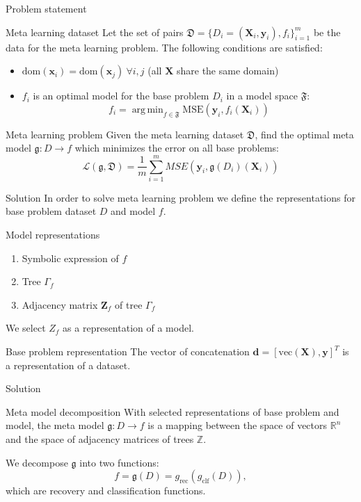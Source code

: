 \documentclass{beamer}
\DeclareMathOperator*{\argmin}{arg\,min}
\begin{document}
\begin{frame}{Problem statement}
	\begin{block}{Meta learning dataset}
		Let the set of pairs $\mathfrak{D} = \{D_i = (\mathbf{X}_i, \mathbf{y}_i), f_i\}_{i=1}^m$ be the data for the meta learning problem. The following conditions are satisfied:
		\begin{itemize}
			\item $\text{dom}(\mathbf{x}_i) = \text{dom}(\mathbf{x}_j)\ \forall i, j$ (all $\mathbf{X}$ share the same domain)
			\item $f_i$ is an optimal model for the base problem $D_i$ in a model space $\mathfrak{F}$:
			\[f_i = \argmin_{f \in \mathfrak{F}} \text{MSE}(\mathbf{y}_i, f_i(\mathbf{X}_i))\]
		\end{itemize}
	\end{block}
	\begin{block}{Meta learning problem}
		Given the meta learning dataset $\mathfrak{D}$, find the optimal meta model $\mathfrak{g}: D \rightarrow f$ which minimizes the error on all base problems:
		\[\mathcal{L}(\mathfrak{g}, \mathfrak{D}) = \frac{1}{m}\sum_{i=1}^m MSE(\mathbf{y}_i, \mathfrak{g}(D_i)(\mathbf{X}_i))\]
	\end{block}
\end{frame}

\begin{frame}{Solution}
	In order to solve meta learning problem we define the representations for base problem dataset $D$ and model $f$.
	\begin{block}{Model representations}
	\begin{enumerate}
		\item Symbolic expression of $f$
		\item Tree $\Gamma_f$
		\item Adjacency matrix $\mathbf{Z}_f$ of tree $\Gamma_f$
	\end{enumerate}
	We select $Z_f$ as a representation of a model.
	\end{block}
	\begin{block}{Base problem representation}
		The vector of concatenation $\mathbf{d} = [\text{vec}(\mathbf{X}), \mathbf{y}]^T$ is a representation of a dataset.
	\end{block}
\end{frame}

\begin{frame}{Solution}
	\begin{block}{Meta model decomposition}
		With selected representations of base problem and model, the meta model $\mathfrak{g}: D \rightarrow f$ is a mapping between the space of vectors $\mathbb{R}^n$ and the space of adjacency matrices of trees $\mathbb{Z}$.

		We decompose $\mathfrak{g}$ into two functions:
		\[f = \mathfrak{g}(D) = g_{\text{rec}}(g_{\text{clf}}(D)),\]
		which are recovery and classification functions.
	\end{block}
\end{frame}
\end{document}
